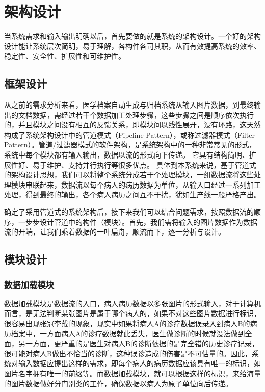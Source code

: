 \chapter{架构设计}
\label{chap:system-framework}
当系统需求和输入输出明确以后，首先要做的就是系统的架构设计。一个好的架构设计能让系统层次简明，易于理解，各构件各司其职，从而有效提高系统的效率、稳定性、安全性、扩展性和可维护性。

\section{框架设计}
从之前的需求分析来看，医学档案自动生成与归档系统从输入图片数据，到最终输出的文档数据，需经过若干个数据加工处理步骤，这些步骤之间是顺序依次执行的，并且模块之间没有相互的反馈关系，即模块间以线性展开，没有环路，这天然构成了系统架构设计中的管道模式（Pipeline Pattern）\citep{Vermeulen1995pipeline}，或称过滤器模式（Filter Pattern）。管道/过滤器模式的软件架构，是系统架构中的一种非常常见的形式，系统中每个模块都有输入输出，数据以流的形式向下传递。
它具有结构简明、扩展性好、易于维护、支持并行执行等很多优点。
具体到本系统来说，基于管道式的架构设计思想，我们可以将整个系统分成若干个处理模块，一组数据流将这些处理模块串联起来，数据流以每个病人的病历数据为单位，从输入口经过一系列加工处理，得到最终的输出，各个病人病历之间互不干扰，犹如生产线一般严格产出。

确定了采用管道式的系统架构后，接下来我们可以结合问题需求，按照数据流的顺序，一步步设计管道中的构件（模块）。首先，我们需将输入的图片数据作为数据流的开端，让我们乘着数据的一叶扁舟，顺流而下，逐一分析与设计。

\section{模块设计}
\subsection{数据加载模块}
数据加载模块是数据流的入口，病人病历数据以多张图片的形式输入，对于计算机而言，是无法判断某张图片是属于哪个病人的，如果不对这些图片数据进行标识，很容易出现张冠李戴的现象，现实中如果将病人A的诊疗数据误录入到病人B的病历档案中，一方面病人A的诊疗数据就此丢失，医生做诊断的时候就没法做到全面，另一方面，更严重的是医生对病人B的诊断依据的是完全错的历史诊疗记录，很可能对病人B做出不恰当的诊断，这种误诊造成的伤害是不可估量的。因此，系统对输入数据应提出这样的需求，即每个病人的病历数据应该具有唯一的标识，如图片名字拥有唯一的前缀等。而数据加载模块，就可以根据这样的标识，来给海量的图片数据做好分门别类的工作，确保数据以病人为原子单位向后传递。

